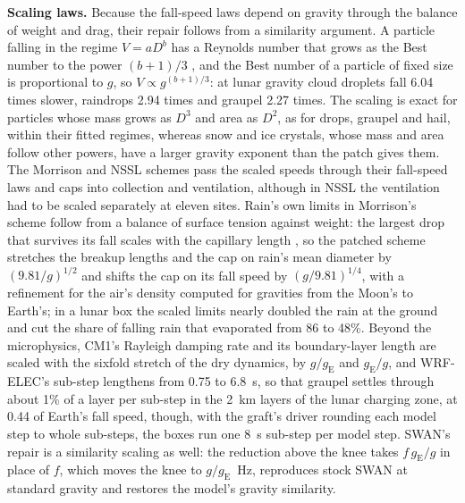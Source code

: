 \textbf{Scaling laws.} Because the fall-speed laws depend on gravity through the balance of weight and drag, their
repair follows from a similarity argument. A particle falling in the regime $V = aD^b$ has a Reynolds number
that grows as the Best number to the power $(b+1)/3$ \autocite{mitchell1996use}, and the Best number of a
particle of fixed size is proportional to $g$, so $V \propto g^{(b+1)/3}$: at lunar gravity cloud droplets
fall 6.04 times slower, raindrops 2.94 times and graupel 2.27 times. The scaling is exact for
particles whose mass grows as $D^3$ and area as $D^2$, as for drops, graupel and hail, within their fitted
regimes, whereas snow and ice crystals, whose mass and area follow other powers, have a larger gravity exponent than the patch gives them. The Morrison and NSSL schemes pass the scaled speeds through their
fall-speed laws and caps into collection and ventilation, although in NSSL the ventilation had to be scaled separately at eleven sites. Rain's own limits in Morrison's
scheme follow from a balance of surface tension against weight: the largest drop that survives its fall scales with
the capillary length \autocite{loftus2021physics}, so the patched scheme stretches the breakup lengths and the cap on rain's mean diameter by
$(9.81/g)^{1/2}$ and shifts the cap on its fall speed by $(g/9.81)^{1/4}$, with a refinement for the air's density
computed for gravities from the Moon's to Earth's; in a lunar box the scaled limits
nearly doubled the rain at the ground and cut the share of falling rain that evaporated from 86 to
48\%. Beyond the microphysics, CM1's Rayleigh damping rate and its boundary-layer length
are scaled with the sixfold stretch of the dry dynamics, by $g/g_\mathrm{E}$ and $g_\mathrm{E}/g$, and
WRF-ELEC's sub-step lengthens from 0.75 to 6.8~s, so that graupel settles through about 1\% of a layer per
sub-step in the 2~km layers of the lunar charging zone, at 0.44 of Earth's fall speed, though, with the graft's driver rounding each model step to whole sub-steps, the boxes run one 8~s sub-step per model step. SWAN's repair is a similarity
scaling as well: the reduction above the knee takes $f\,g_\mathrm{E}/g$ in place of $f$, which moves the knee
to $g/g_\mathrm{E}$~Hz, reproduces stock SWAN at standard gravity and restores the model's gravity
similarity.

